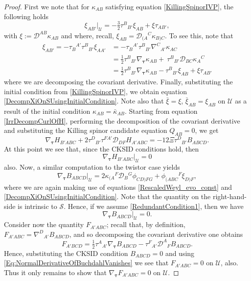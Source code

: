 \documentclass[10pt,a4paper]{article}
\theoremstyle{plain}
\begin{document}
\begin{proof}
First we note that for $\kappa_{AB}$ satisfying equation \eqref{KillingSpinorIVP}, the following holds
\begin{equation}
\xi_{AB'}|_{\mathcal{U}} = -\tfrac{3}{2}
\tau^B{}_{B'}\xi_{AB} +
\xi\tau_{AB'}, \label{DecompXiOnSUsingInitialCondition}
\end{equation}
with $\xi:=\mathcal{D}^{AB}\kappa_{AB}$ and where, recall, $\xi_{AB}=\mathcal{D}_{(A}{}^C\kappa_{B)C}$. To see this, note that
\begin{align}
\xi_{AB'} = - \tau_{B}{}^{A'} \tau^{B}{}_{B'}\xi_{AA'}
&= - \tau_{B}{}^{A'} \tau^{B}{}_{B'}\nabla^C{}_{A'}\kappa_{AC}\nonumber\\
&=\tfrac{1}{2}\tau^{B}{}_{B'}\nabla_{\bm\tau}\kappa_{AB} +
\ \tau^{B}{}_{B'}
\mathcal{D}_{BC}\kappa_{A}{}^{C} \nonumber\\ &=\tfrac{1}{2}\tau^{B}{}_{B'}\nabla_{\bm\tau}\kappa_{AB}
- \tau^B{}_{B'}\xi_{AB} + \xi\tau_{AB'}\label{AuxXiExpanded} 
\end{align}
where we are decomposing the covariant derivative. Finally,
substituting the initial condition from \eqref{KillingSpinorIVP}, we
obtain equation \eqref{DecompXiOnSUsingInitialCondition}. Note also
that $\bar{\xi}=\xi$, $\bar{\xi}_{AB} = \xi_{AB}$ on $\mathcal{U}$ as
a result of the initial condition $\kappa_{AB}=\bar{\kappa}_{AB}$.
Starting from equation \eqref{IrrDecompCurlOfH}, performing the
decomposition of the covariant derivative and substituting the Killing
spinor candidate equation $Q_{AB}=0$, we get
\[ \nabla_{\bm\tau} H_{B'ABC} + 2 \tau^{D}{}_{B'} \tau^{FA'} \mathcal{D}_{DF}H_{A'ABC} = -12 \Xi \tau^{D}{}_{B'}B_{ABCD}.\]
At this point we see that, since the CKSID conditions hold, then
\[\nabla_{\bm\tau} H_{B'ABC}\big\vert_{\mathcal{U}}=0\] also. Now, a similar computation to the
twistor case yields
\begin{equation}
    \nabla_{\bm\tau} B_{ABCD}|_{\mathcal{U}} = 2
    \kappa_{(A}{}^{F}\mathcal{D}_{B}{}^{G}\phi_{CD)FG} +
    \phi_{(ABC}{}^{F}\xi_{D)F},\label{EvolutionForBuchdahl}
\end{equation}
where we are again making use of equations
\eqref{RescaledWeyl_evo_const} and
\eqref{DecompXiOnSUsingInitialCondition}.  Note that the quantity on
the right-hand-side is intrinsic to $\mathcal{S}$. Hence, if we assume
\eqref{RedundantCondition1}, then we have
\begin{equation}\label{Eq:NormalDerivativeOfBuchdahlVanishes}
    \nabla_{\bm\tau}B_{ABCD} |_{\mathcal{U}}= 0.
\end{equation}
Consider now the quantity $F_{A'ABC}$; recall that, by definition,
$F_{A'ABC}=\nabla^D{}_{A'}B_{ABCD}$, and so decomposing the covariant
derivative one obtains
\[F_{A'BCD} = \tfrac{1}{2} \tau^{A}{}_{A'} \nabla_{\bm\tau} B_{ABCD}  -  \tau^{F}{}_{A'} \mathcal{D}^{A}{}_{F}B_{ABCD}.\]
Hence, substituting the CKSID condition $B_{ABCD}=0$ and using
\eqref{Eq:NormalDerivativeOfBuchdahlVanishes} we see that
$F_{A'ABC}=0$ on $\mathcal{U}$, also.  Thus it only remains to show
that $\nabla_{\bm\tau}F_{A'ABC}=0$ on $\mathcal{U}$.


\end{proof}
\end{document}
